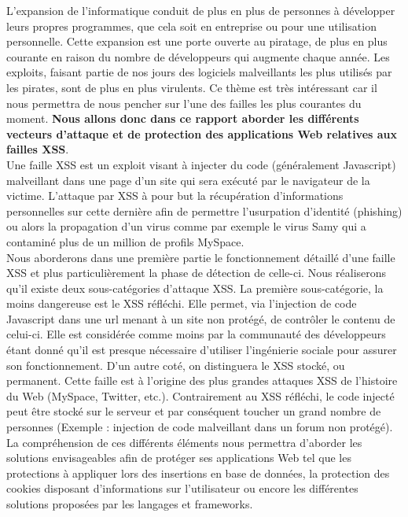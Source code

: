 \documentclass[a4paper,12pt]{report}
\begin{document}
L’expansion de l’informatique conduit de plus en plus de personnes à développer leurs propres programmes, que cela soit en entreprise ou pour une utilisation personnelle. Cette expansion est une porte ouverte au piratage, de plus en plus courante en raison du nombre de développeurs qui augmente chaque année. Les exploits, faisant partie de nos jours des logiciels malveillants les plus utilisés par les pirates, sont de plus en plus virulents.
Ce thème est très intéressant car il nous permettra de nous pencher sur l'une des failles les plus courantes du moment. \textbf{Nous allons donc dans ce rapport aborder les différents vecteurs d'attaque et de protection des applications Web relatives aux failles XSS}.\\

Une faille XSS est un exploit visant à injecter du code (généralement Javascript) malveillant dans une page d'un site qui sera exécuté par le navigateur de la victime. L'attaque par XSS à pour but la récupération d'informations personnelles sur cette dernière afin de permettre l'usurpation d'identité (phishing) ou alors la propagation d'un virus comme par exemple le virus Samy qui a contaminé plus de un million de profils MySpace. \\

Nous aborderons dans une première partie le fonctionnement détaillé d'une faille XSS et plus particulièrement la phase de détection de celle-ci. Nous réaliserons qu'il existe deux sous-catégories d'attaque XSS. La première sous-catégorie, la moins dangereuse est le XSS réfléchi. Elle permet, via l'injection de code Javascript dans une url menant à un site non protégé, de contrôler le contenu de celui-ci. Elle est considérée comme moins par la communauté des développeurs étant donné qu'il est presque nécessaire d'utiliser l'ingénierie sociale pour assurer son fonctionnement. D'un autre coté, on distinguera le XSS stocké, ou permanent. Cette faille est à l'origine des plus grandes attaques XSS de l'histoire du Web (MySpace, Twitter, etc.). Contrairement au XSS réfléchi, le code injecté peut être stocké sur le serveur et par conséquent toucher un grand nombre de personnes (Exemple : injection de code malveillant dans un forum non protégé). La compréhension de ces différents éléments nous permettra d'aborder les solutions envisageables afin de protéger ses applications Web tel que les protections à appliquer lors des insertions en base de données, la protection des cookies disposant d'informations sur l'utilisateur ou encore les différentes solutions proposées par les langages et frameworks.  \\
\end{document}

